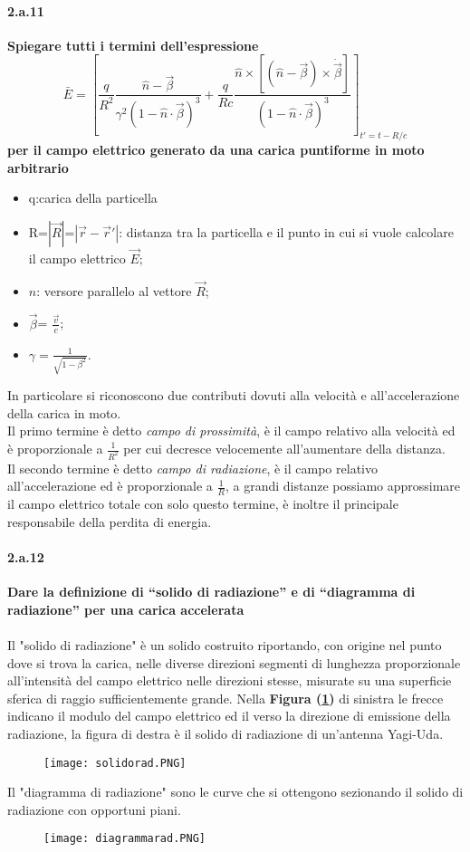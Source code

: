 \documentclass[twoside]{article}
\begin{document}
\paragraph{2.a.11}\textbf{Spiegare tutti i termini dell'espressione
\[
\bar{E}=\left[\frac{q}{R^2}\frac{\hat{n}-\vec{\beta}}{\gamma^2(1-\hat{n}\cdot \vec{\beta})^3}+ \frac{q}{R c}\frac{\hat{n}\times[(\hat{n}-\vec{\beta})\times \dot{\vec{\beta}}]}{(1-\hat{n}\cdot \vec{\beta})^3}\right]_{t'=t-R/c} 
\]
per il campo elettrico generato da una carica puntiforme in moto arbitrario
}
\begin{itemize}
    \item q:carica della particella
    \item R=$|\vec{R}|$=$|\vec{r}-\vec{r}'|$: distanza tra la particella e il punto in cui si vuole calcolare il campo elettrico $\vec{E}$;
    \item $\hat{n}$: versore parallelo al vettore $\vec{R}$;
    \item $\vec{\beta}$= $\frac{\vec{v}}{c}$;
    \item $\gamma=\frac{1}{\sqrt{1-\beta^2}}$.
\end{itemize}
In particolare si riconoscono due contributi dovuti alla velocità e all'accelerazione della carica in moto.\\
Il primo termine è detto \textit{campo di prossimità}, è il campo relativo alla velocità ed è proporzionale a $\frac{1}{R^2}$ per cui decresce velocemente all'aumentare della distanza.\\
Il secondo termine è detto \textit{campo di radiazione}, è il campo relativo all'accelerazione ed è proporzionale a $\frac{1}{R}$, a grandi distanze possiamo approssimare il campo elettrico totale con solo questo termine, è inoltre il principale responsabile della perdita di energia.


\paragraph{2.a.12}\textbf{Dare la definizione di “solido di radiazione” e di “diagramma di radiazione” per una carica accelerata}\\
\\
Il "solido di radiazione" è un solido costruito riportando, con origine nel punto dove si trova la carica, nelle diverse direzioni segmenti di lunghezza proporzionale all'intensità del campo elettrico nelle direzioni stesse, misurate su una superficie sferica di raggio sufficientemente grande. Nella \textbf{Figura (\ref{Solid}) } di sinistra le frecce indicano il modulo del campo elettrico ed il verso la direzione di emissione della radiazione, la figura di destra è il solido di radiazione di un'antenna Yagi-Uda. \\
\begin{figure}[H]
    \centering
    \texttt{[image: solidorad.PNG]}
    \label{Solid}
\end{figure}
Il "diagramma di radiazione" sono le curve che si ottengono sezionando il solido di radiazione con opportuni piani.
\begin{figure}[H]
    \centering
    \texttt{[image: diagrammarad.PNG]}
\end{figure}
\end{document}
